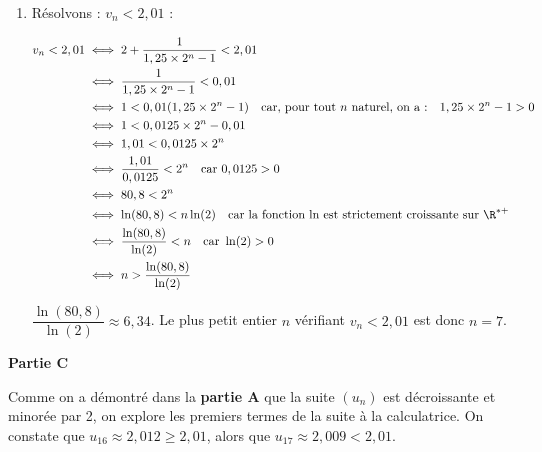 \begin{enumerate}
\begin{enumerate}
			Ce qui implique : \quad $v_n = 2 + \dfrac{1}{1,25 \times 2^n - 1}$.

			\item Comme $w_0 = 1,25 > 0$ et $q = 2 > 1$, par propriété :\quad $\lim\limits_{n \to +\infty} 1,25 \times 2^n = +\infty$.

			Par limite de la somme :\quad $\lim\limits_{n \to +\infty} 1,25 \times 2^n - 1 = +\infty$.

			Puis, par limite de l'inverse :\quad $\lim\limits_{n \to +\infty} \dfrac{1}{1,25 \times 2^n -1} = 0$.

			Finalement, par limite de la somme :\quad $\lim\limits_{n \to +\infty} v_n = 2$.
		\end{enumerate}

		\item Résolvons : $v_n < 2,01$ :

		$\begin{aligned}[t]
			v_n < 2,01 &\iff 2 + \dfrac{1}{1,25 \times 2^n - 1} < 2,01\\
			&\iff \dfrac{1}{1,25 \times 2^n - 1} < 0,01\\
			&\iff 1 < 0,01(1,25 \times 2^n - 1)\quad \text{car, pour tout $n$ naturel, on a :}\quad 1,25\times 2^n - 1 > 0\\
			&\iff 1 < 0,0125 \times 2^n - 0,01\\
			&\iff 1,01 < 0,0125 \times 2^n\\
			&\iff \dfrac{1,01}{0,0125} < 2^n\quad \text{car } 0,0125 > 0\\
			&\iff 80,8 < 2^n\\
			&\iff \ln(80,8) < n\ln(2)\quad \text{car la fonction ln est strictement croissante sur }\R^{*+}\\
			&\iff \dfrac{\ln(80,8)}{\ln(2)} < n\quad \text{car }\ln(2) > 0\\
			&\iff n > \dfrac{\ln(80,8)}{\ln(2)}\end{aligned}$

		$\dfrac{\ln(80,8)}{\ln(2)} \approx 6,34$. \quad
		Le plus petit entier $n$ vérifiant $v_n < 2,01$ est donc $n = 7$.
	\end{enumerate}

	\bigskip

	\textbf{Partie C}

	\medskip

	Comme on a démontré dans la \textbf{partie A} que la suite $(u_n)$ est décroissante et minorée par 2, on explore les premiers termes de la suite à la calculatrice. On constate que $u_{16} \approx 2,012 \geqslant 2,01$, alors que $u_{17}\approx 2,009 < 2,01$.

